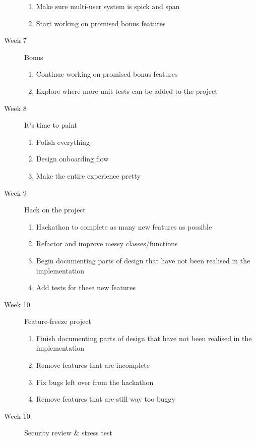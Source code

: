 \documentclass[a4paper]{article}
\begin{document}
\begin{description}
\begin{enumerate}
            \item Make sure multi-user system is spick and span
            \item Start working on promised bonus features
        \end{enumerate}
    \item[Week 7] Bonus
        \begin{enumerate}
            \item Continue working on promised bonus features
            \item Explore where more unit tests can be added to the project
        \end{enumerate}
    \item[Week 8] It's time to paint
        \begin{enumerate}
            \item Polish everything
            \item Design onboarding flow
            \item Make the entire experience pretty
        \end{enumerate}
    \newpage
    \item[Week 9] Hack on the project
        \begin{enumerate}
            \item Hackathon to complete as many new features as possible
            \item Refactor and improve messy classes/functions
            \item Begin documenting parts of design that have not been realised in the implementation
            \item Add tests for these new features
        \end{enumerate}
    \item[Week 10] Feature-freeze project
        \begin{enumerate}
            \item Finish documenting parts of design that have not been realised in the implementation
            \item Remove features that are incomplete
            \item Fix bugs left over from the hackathon
            \item Remove features that are still way too buggy
        \end{enumerate}
    \item[Week 10] Security review \& stress test
        \begin{enumerate}

\end{enumerate}
\end{description}
\end{document}
